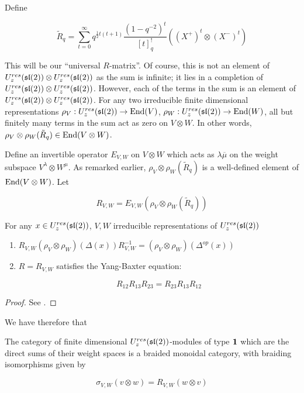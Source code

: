 Define 

\begin{equation}
\tilde{R}_q = \sum_{t=0}^\infty q^{\frac{1}{2} t(t+1)} \frac{(1-q^{-2})^t}{[t]_q^{!}} ((X^+)^t \otimes (X^-)^t)
\end{equation}

This will be our ``universal $R$-matrix''. Of course, this is not an element of
$U_z^{res}(\mathfrak{sl}(2)) \otimes U_z^{res}(\mathfrak{sl}(2))$ as the sum is infinite; it lies in a
completion of $U_z^{res}(\mathfrak{sl}(2)) \otimes U_z^{res}(\mathfrak{sl}(2))$. However, each of the terms
in the sum is an element of $U_z^{res}(\mathfrak{sl}(2)) \otimes U_z^{res}(\mathfrak{sl}(2))$. For any
two irreducible finite dimensional representations $\rho_V : U_z^{res}(\mathfrak{sl}(2)) \to
\operatorname{End}(V)$, $\rho_W : U_z^{res}(\mathfrak{sl}(2)) \to \operatorname{End}(W)$, all but finitely many terms in the
sum act as zero on $V \otimes W$. In other words, $\rho_V \otimes \rho_W
(\tilde{R}_q) \in \operatorname{End}(V \otimes W)$. 

Define an invertible operator $E_{V,W}$ on $V \otimes W$ which acts as
$\lambda\overline{\mu}$ on the weight subspace $V^\lambda \otimes W^\mu$. As remarked
earlier, $\rho_V \otimes \rho_W (\tilde{R}_q) $ is a well-defined element of
$\operatorname{End}(V \otimes W)$. Let 

\begin{equation}
R_{V,W} = E_{V,W} \left(\rho_V \otimes \rho_W (\tilde{R}_q)\right)
\end{equation}

\begin{claim}
For any $x \in U_z^{res}(\mathfrak{sl}(2))$, $V,W$ irreducible representations of $U_z^{res}(\mathfrak{sl}(2))$
\begin{enumerate}
\item $R_{V,W} (\rho_V \otimes \rho_W) (\Delta(x)) R^{-1}_{V,W} = (\rho_{V} \otimes \rho_W)(\Delta^{op}(x))$
\item $R=R_{V,W}$  satisfies the Yang-Baxter equation: 

\begin{equation}
R_{12} R_{13} R_{23} = R_{23} R_{13} R_{12}
\end{equation}
\end{enumerate}
\end{claim}
\begin{proof}
    See \cite{CP}.
\end{proof}

We have therefore that 

\begin{theorem}
\label{theorem:Braiding}
The category of finite dimensional $U_z^{res}(\mathfrak{sl}(2))$-modules of type
$\mathbf{1}$ which are the direct sums of their weight spaces is a braided
monoidal category, with braiding isomorphisms given by 

\begin{equation}
\sigma_{V,W}(v \otimes w) = R_{V,W}(w \otimes v)
\end{equation}
\end{theorem}


